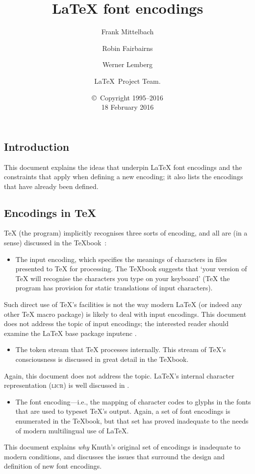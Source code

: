 \documentclass{ltxguide}[1994/11/20]
\title{\LaTeX{} font encodings}
\author{Frank Mittelbach \and Robin
   Fairbairns \and Werner Lemberg \and \LaTeX\ Project Team.}
\date{\copyright~Copyright 1995--2016 \\[5pt] 18 February 2016}
\providecommand{\Pkg}[1]{%
  \textsf{#1}}
\begin{document}
\maketitle

\tableofcontents

\subsection{Introduction}

This document explains the ideas that underpin \LaTeX{} font
encodings and the constraints that apply when defining a new encoding; it
also lists the encodings that have already been defined.

\subsection{Encodings in \TeX{}}

\TeX{} (the program) implicitly recognises three sorts of encoding,
and all are (in a sense) discussed in the \TeX{}book~\cite{A-W:DKn86}:
\begin{itemize}
\item[1.] The input encoding, which specifies the meanings of characters
  in files presented to \TeX{} for processing.  The \TeX{}book
  suggests that `your version of \TeX{} will recognise the characters
  you type on your keyboard' (\TeX{} the program has provision for
  static translations of input characters).
\end{itemize}
Such direct use of \TeX{}'s facilities is not the way modern
\LaTeX{} (or indeed any other \TeX{} macro package) is likely to deal
with input encodings.   This document does not address the topic of
input encodings; the interested reader should examine the \LaTeX{}
base package \Pkg{inputenc} \cite[sec.~7.5.2, p.~357]{A-W:MG2004}.
\begin{itemize}
\item[2.] The token stream that \TeX{} processes internally.  This stream
  of \TeX{}'s consciousness is discussed in great detail in the
  \TeX{}book.
\end{itemize}
Again, this document does not address the topic.  \LaTeX's internal
character representation (\textsc{licr}) is well discussed in
\cite[sec.~7.11.2, p.~442]{A-W:MG2004}.
\begin{itemize}
\item[3.] The font encoding---i.e., the mapping of character codes to
  glyphs in the fonts that are used to typeset \TeX{}'s output.
  Again, a set of font encodings is enumerated in the \TeX{}book, but
  that set has proved inadequate to the needs of modern multilingual
  use of \LaTeX.
\end{itemize}
This document explains \emph{why} Knuth's original set of encodings is
inadequate to modern conditions, and discusses the issues that
surround the design and definition of new font encodings.
\end{document}

